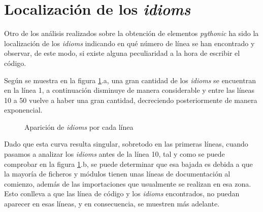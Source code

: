 \documentclass[a4paper, 12pt]{book}
\begin{document}

\section{Localización de los \textit{idioms}}

Otro de los análisis realizados sobre la obtención de elementos \textit{pythonic} ha sido la localización de los \textit{idioms} indicando en qué número de línea se han encontrado y observar, de este modo, si existe alguna peculiaridad a la hora de escribir el código.

Según se muestra en la figura \ref{fig:lines_idioms}.a, una gran cantidad de los \textit{idioms} se encuentran en la línea 1, a continuación disminuye de manera considerable y entre las líneas 10 a 50 vuelve a haber una gran cantidad, decreciendo posteriormente de manera exponencial. 

\begin{figure}[b]
\centering
{}
\caption{Aparición de \textit{idioms} por cada línea}
\label{fig:lines_idioms}
\end{figure}

Dado que esta curva resulta singular, sobretodo en las primeras líneas, cuando pasamos a analizar los \textit{idioms} antes de la línea 10, tal y como se puede comprobar en la figura \ref{fig:lines_idioms}.b, se puede determinar que esa bajada es debida a que la mayoría de ficheros y módulos tienen unas líneas de documentación al comienzo, además de las importaciones que usualmente se realizan en esa zona. Esto conlleva a que las línea de código y los \textit{idioms} encontrados, no puedan aparecer en esas líneas, y en consecuencia, se muestren más adelante.
\end{document}
